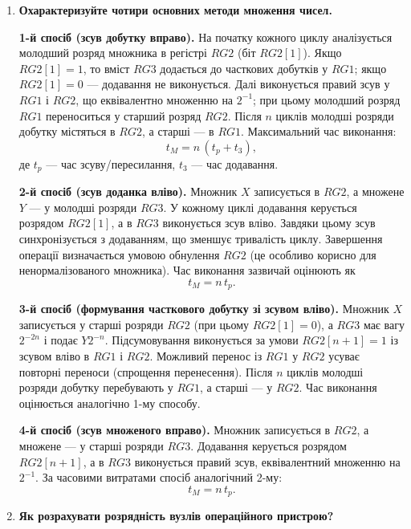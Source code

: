 \documentclass[12pt,a4paper]{article}
\begin{document}
    \begin{enumerate}
        \item \textbf{Охарактеризуйте чотири основних методи множення чисел.}

        \textbf{1-й спосіб (зсув добутку вправо).}
        На початку кожного циклу аналізується молодший розряд множника в регістрі $RG2$ (біт $RG2[1]$).
        Якщо $RG2[1]=1$, то вміст $RG3$ додається до часткових добутків у $RG1$; якщо $RG2[1]=0$ --- додавання не виконується.
        Далі виконується правий зсув у $RG1$ і $RG2$, що еквівалентно множенню на $2^{-1}$; при цьому молодший розряд $RG1$ переноситься у старший розряд $RG2$.
        Після $n$ циклів молодші розряди добутку містяться в $RG2$, а старші --- в $RG1$.
        Максимальний час виконання:
        \[
            t_M = n\,(t_p + t_3),
        \]
        де $t_p$ --- час зсуву/пересилання, $t_3$ --- час додавання.

        \textbf{2-й спосіб (зсув доданка вліво).}
        Множник $X$ записується в $RG2$, а множене $Y$ --- у молодші розряди $RG3$.
        У кожному циклі додавання керується розрядом $RG2[1]$, а в $RG3$ виконується зсув вліво.
        Завдяки цьому зсув синхронізується з додаванням, що зменшує тривалість циклу.
        Завершення операції визначається умовою обнулення $RG2$ (це особливо корисно для ненормалізованого множника).
        Час виконання зазвичай оцінюють як
        \[
            t_M = n\,t_p.
        \]

        \textbf{3-й спосіб (формування часткового добутку зі зсувом вліво).}
        Множник $X$ записується у старші розряди $RG2$ (при цьому $RG2[1]=0$), а $RG3$ має вагу $2^{-2n}$ і подає $Y2^{-n}$.
        Підсумовування виконується за умови $RG2[n+1]=1$ із зсувом вліво в $RG1$ і $RG2$.
        Можливий перенос із $RG1$ у $RG2$ усуває повторні переноси (спрощення перенесення).
        Після $n$ циклів молодші розряди добутку перебувають у $RG1$, а старші --- у $RG2$.
        Час виконання оцінюється аналогічно 1-му способу.

        \textbf{4-й спосіб (зсув множеного вправо).}
        Множник записується в $RG2$, а множене --- у старші розряди $RG3$.
        Додавання керується розрядом $RG2[n+1]$, а в $RG3$ виконується правий зсув, еквівалентний множенню на $2^{-1}$.
        За часовими витратами спосіб аналогічний 2-му:
        \[
            t_M = n\,t_p.
        \]

        \item \textbf{Як розрахувати розрядність вузлів операційного пристрою?}


\end{enumerate}
\end{document}
